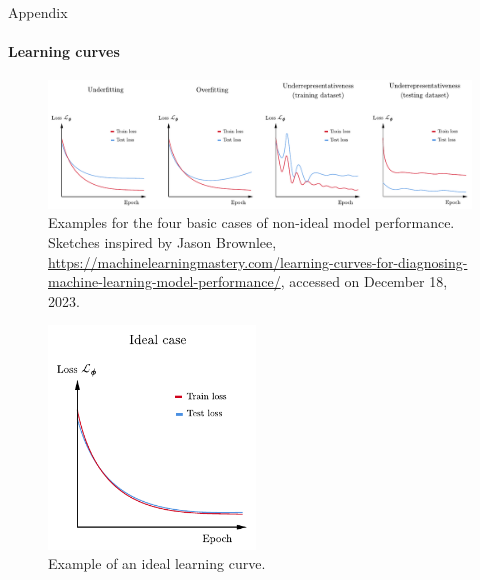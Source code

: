\documentclass{beamer}
\begin{document}
\begin{frame}[allowframebreaks]{Appendix}
	\framesubtitle{Learning curves}
	\begin{figure}[h]
		\centering
		\includegraphics[width=\textwidth]{figures/thesis/learningcurves.pdf}
		\caption{Examples for the four basic cases of non-ideal model performance. Sketches inspired by Jason Brownlee, \url{https://machinelearningmastery.com/learning-curves-for-diagnosing-machine-learning-model-performance/}, accessed on December 18, 2023.}
		\label{fig:learningcurves}
	\end{figure}
	
	\begin{figure}[h]
		\centering
		\includegraphics[width=5.5cm]{figures/thesis/ideallearningcurve.pdf}
		\caption{Example of an ideal learning curve.}
		\label{fig:ideallearningcurve}
	\end{figure}
	
\end{frame}
\end{document}

